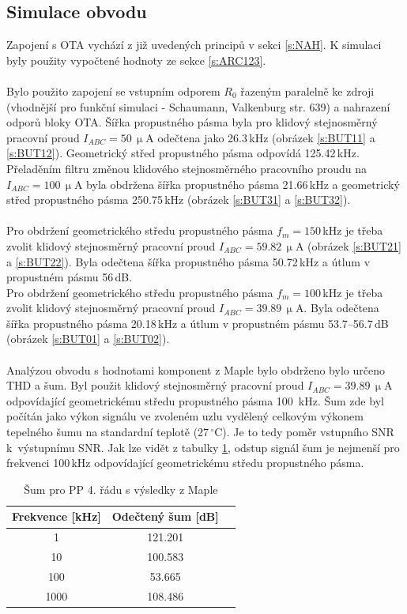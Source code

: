 \subsection{Simulace obvodu}
\noindent  Zapojení s OTA vychází z již uvedených principů v sekci \ref{s:NAH}. K simulaci byly použity vypočtené hodnoty ze sekce \ref{s:ARC123}. \\
\\
\noindent Bylo použito zapojení se vstupním odporem $R_0$ řazeným paralelně ke zdroji (vhodnější pro funkční simulaci - Schaumann, Valkenburg \cite{13} str. 639) a nahrazení odporů bloky OTA. Šířka propustného pásma byla pro klidový stejnosměrný pracovní proud $I_{ABC} = 50$\,$\upmu$A odečtena jako 26.3\,kHz (obrázek \ref{s:BUT11} a \ref{s:BUT12}). Geometrický střed propustného pásma odpovídá 125.42\,kHz. Přeladěním filtru změnou klidového stejnosměrného pracovního proudu na $I_{ABC} = 100$\,$\upmu$A byla obdržena šířka propustného pásma 21.66\,kHz a geometrický střed propustného pásma 250.75\,kHz (obrázek \ref{s:BUT31} a \ref{s:BUT32}). \\
\\
Pro obdržení geometrického středu propustného pásma $f_m = 150$\,kHz je třeba zvolit klidový stejnosměrný pracovní proud $I_{ABC} = 59.82$\,$\upmu$A (obrázek \ref{s:BUT21} a \ref{s:BUT22}). Byla odečtena šířka propustného pásma 50.72\,kHz a útlum v propustném pásmu 56\,dB. \\
Pro obdržení geometrického středu propustného pásma $f_m = 100$\,kHz je třeba zvolit klidový stejnosměrný pracovní proud $I_{ABC} = 39.89$\,$\upmu$A. Byla odečtena šířka propustného pásma 20.18\,kHz a útlum v propustném pásmu 53.7--56.7\,dB (obrázek \ref{s:BUT01} a \ref{s:BUT02}).\\
\\
Analýzou obvodu s hodnotami komponent z Maple bylo obdrženo bylo určeno THD a šum. Byl použit klidový stejnosměrný pracovní proud $I_{ABC} = 39.89$\,$\upmu$A odpovídající geometrickému středu propustného pásma 100~kHz. Šum zde byl počítán jako výkon signálu ve zvoleném uzlu vydělený celkovým výkonem tepelného šumu na standardní teplotě (27\,$^{\circ}$C). Je to tedy poměr vstupního SNR k~výstupnímu SNR. Jak lze vidět z tabulky \ref{s:THD111}, odstup signál šum je nejmenší pro frekvenci 100\,kHz odpovídající geometrickému středu propustného pásma.
\begin{table}[h]
\centering
  \begin{tabular}{ | c | c | c |}
    \hline
     Frekvence [kHz] & Odečtený šum [dB] \\ \hline
    1 & 121.201 \\ \hline
    10 & 100.583 \\ \hline
    100 & 53.665 \\ \hline
    1000 & 108.486 \\ \hline
  \end{tabular}
  \caption[Šum pro PP 4. řádu (Maple)]{Šum pro PP 4. řádu s výsledky z Maple \label{s:THD111}}
\end{table}
